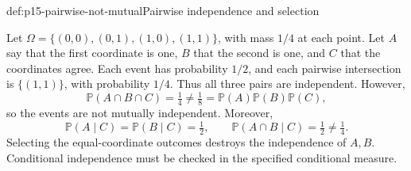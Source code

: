 \begin{hbexample}{def:p15-pairwise-not-mutual}{Pairwise independence and selection}
\par\nobreak
Let \(\Omega=\{(0,0),(0,1),(1,0),(1,1)\}\), with mass \(1/4\)
at each point. Let \(A\) say that the first coordinate is one,
\(B\) that the second is one, and \(C\) that the coordinates agree.
Each event has probability \(1/2\), and each pairwise intersection is
\(\{(1,1)\}\), with probability \(1/4\). Thus all three pairs are
independent. However,
\[
 \mathbb P(A\cap B\cap C)=\tfrac14
 \ne\tfrac18=\mathbb P(A)\mathbb P(B)\mathbb P(C),
\]
so the events are not mutually independent. Moreover,
\[
 \mathbb P(A\mid C)=\mathbb P(B\mid C)=\tfrac12,
 \qquad \mathbb P(A\cap B\mid C)=\tfrac12\ne\tfrac14.
\]
Selecting the equal-coordinate outcomes destroys the independence of
\(A,B\). Conditional independence must be checked in the specified
conditional measure.
\end{hbexample}

